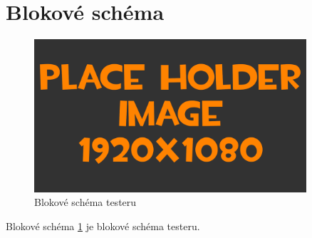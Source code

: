 
\section{Blokové schéma}
\begin{figure}[H]
	\centering
	\includegraphics[width=0.9\textwidth]{pictures/placeHolderFHD.png}
    	\caption{Blokové schéma testeru}
   	\label{fig:testerSchema}
\end{figure}

Blokové schéma \ref{fig:testerSchema} je blokové schéma testeru.

